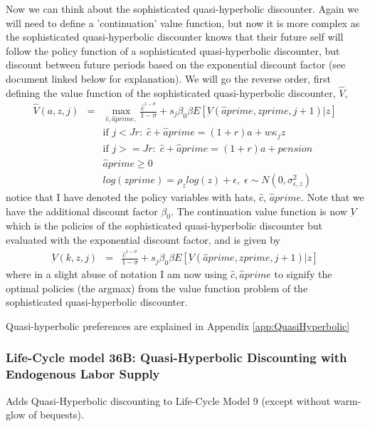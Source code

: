 Now we can think about the sophisticated quasi-hyperbolic discounter. Again we will need to define a 'continuation' value function, but now it is more complex as the sophisticated quasi-hyperbolic discounter knows that their future self will follow the policy function of a sophisticated quasi-hyperbolic discounter, but discount between future periods based on the exponential discount factor (see document linked below for explanation). We will go the reverse order, first defining the value function of the sophisticated quasi-hyperbolic discounter, $\hat{V}$,
\begin{eqnarray*}
 \hat{V}(a,z,j)&=& \max_{\hat{c},\hat{a}prime,} \frac{\hat{c}^{1-\sigma}}{1-\sigma} + s_j \beta_0 \beta E[\underbar{V}(\hat{a}prime,zprime,j+1)|z] \\
&& \text{if }j<Jr: \; \hat{c}+\hat{a}prime=(1+r)a+w \kappa_j z\\
&& \text{if }j>=Jr: \; \hat{c}+\hat{a}prime=(1+r)a +pension\\
&& \hat{a}prime\geq 0 \\
&& log(zprime)=\rho_z log(z) + \epsilon, \; \epsilon \sim N(0,\sigma_{\epsilon,z}^2)
\end{eqnarray*}
notice that I have denoted the policy variables with hats, $\hat{c}$, $\hat{a}prime$. Note that we have the additional discount factor $\beta_0$. The continuation value function is now $\underbar{V}$ which is the policies of the sophisticated quasi-hyperbolic discounter but evaluated with the exponential discount factor, and is given by
\begin{eqnarray*}
 \underbar{V}(k,z,j)&=&\frac{\hat{c}^{1-\sigma}}{1-\sigma} + s_j \beta_0 \beta E[ \underbar{V}(\hat{a}prime,zprime,j+1)|z]
\end{eqnarray*}
where in a slight abuse of notation I am now using $\hat{c},\hat{a}prime$ to signify the optimal policies (the argmax) from the value function problem of the sophisticated quasi-hyperbolic discounter.

Quasi-hyperbolic preferences are explained in Appendix \ref{app:QuasiHyperbolic}

\subsubsection{Life-Cycle model 36B: Quasi-Hyperbolic Discounting with Endogenous Labor Supply}
Adds Quasi-Hyperbolic discounting to Life-Cycle Model 9 (except without warm-glow of bequests).

